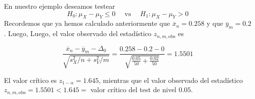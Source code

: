 \documentclass{beamer}
\theoremstyle{definition}
\begin{document}


\begin{frame}%
\small
 En nuestro ejemplo deseamos testear
$$
H_0: \mu_X-\mu_Y \leq 0 \quad \text { vs } \quad H_1: \mu_X-\mu_Y>0
$$
Recordemos que ya hemos calculado anteriormente que $\overline{x}_{n}=0.258$ y que $\overline{y}_{m}=0.2$. Luego,
Luego, el valor observado del estad\'istico $z_{n,m,\text{obs}}$ es

$$
\frac{\overline{x}_{n}-\overline{y}_{m}-\Delta_0}{\sqrt{s_X^2 / n+s_Y^2 / m}}=\frac{0.258-0.2-0}{\sqrt{\frac{0.05}{50}+\frac{0.02}{50}}}=1.5501
$$

El valor cr\'itico es $z_{1-\alpha}=1.645$, mientras que el valor observado del estad\'istico $z_{n,m,\text{obs}}=1.5501<1.645=$ valor cr\'itico del test de nivel $0.05$.


\end{frame}
\end{document}
